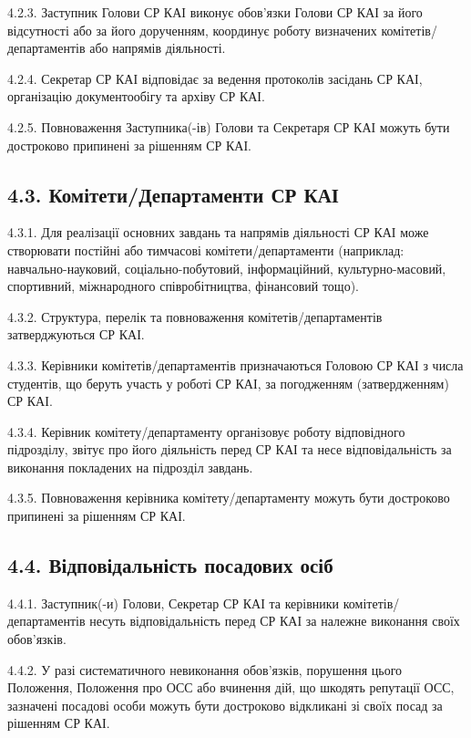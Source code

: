    4.2.3. Заступник Голови СР КАІ виконує обов'язки Голови СР КАІ за його відсутності або за його дорученням, координує роботу визначених комітетів/департаментів або напрямів діяльності.

    4.2.4. Секретар СР КАІ відповідає за ведення протоколів засідань СР КАІ, організацію документообігу та архіву СР КАІ.

    4.2.5. Повноваження Заступника(-ів) Голови та Секретаря СР КАІ можуть бути достроково припинені за рішенням СР КАІ.

\subsection*{4.3. Комітети/Департаменти СР КАІ}
    4.3.1. Для реалізації основних завдань та напрямів діяльності СР КАІ може створювати постійні або тимчасові комітети/департаменти (наприклад: навчально-науковий, соціально-побутовий, інформаційний, культурно-масовий, спортивний, міжнародного співробітництва, фінансовий тощо).

    4.3.2. Структура, перелік та повноваження комітетів/департаментів затверджуються СР КАІ.

    4.3.3. Керівники комітетів/департаментів призначаються Головою СР КАІ з числа студентів, що беруть участь у роботі СР КАІ, за погодженням (затвердженням) СР КАІ.

    4.3.4. Керівник комітету/департаменту організовує роботу відповідного підрозділу, звітує про його діяльність перед СР КАІ та несе відповідальність за виконання покладених на підрозділ завдань.

    4.3.5. Повноваження керівника комітету/департаменту можуть бути достроково припинені за рішенням СР КАІ.

\subsection*{4.4. Відповідальність посадових осіб}
    4.4.1. Заступник(-и) Голови, Секретар СР КАІ та керівники комітетів/департаментів несуть відповідальність перед СР КАІ за належне виконання своїх обов'язків.

    4.4.2. У разі систематичного невиконання обов'язків, порушення цього Положення, Положення про ОСС або вчинення дій, що шкодять репутації ОСС, зазначені посадові особи можуть бути достроково відкликані зі своїх посад за рішенням СР КАІ.
     
